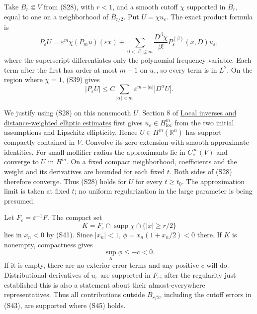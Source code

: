\documentclass[
  11pt,
]{article}
\begin{document}
Take \(B_r\Subset V\) from (S28), with \(r<1\), and a smooth cutoff
\(\chi\) supported in \(B_r\), equal to one on a neighborhood of
\(\overline B_{r/2}\). Put \(U=\chi u_\varepsilon\). The exact product
formula is \[
 P_\varepsilon U
 =\varepsilon^m\chi(P_mu)(\varepsilon x)
   +\sum_{0<|\beta|\leq m}\frac{D^\beta\chi}{\beta!}
                    P_\varepsilon^{(\beta)}(x,D)u_\varepsilon,
                                                                    \tag{S43}
\] where the superscript differentiates only the polynomial frequency
variable. Each term after the first has order at most \(m-1\) on
\(u_\varepsilon\), so every term is in \(L^2\). On the region where
\(\chi=1\), (S39) gives \[
 |P_\varepsilon U|
       \leq C\sum_{|\alpha|<m}
                       \varepsilon^{m-|\alpha|}|D^\alpha U|.    \tag{S44}
\]

We justify using (S28) on this nonsmooth \(U\). Section 8 of
\href{local-elliptic-coefficients.pdf}{Local inverses and
distance-weighted elliptic estimates} first gives
\(u_\varepsilon\in H^m_{\mathrm{loc}}\) from the two initial assumptions
and Lipschitz ellipticity. Hence \(U\in H^m(\mathbb R^n)\) has support
compactly contained in \(V\). Convolve its zero extension with smooth
approximate identities. For small mollifier radius the approximants lie
in \(C_c^\infty(V)\) and converge to \(U\) in \(H^m\). On a fixed
compact neighborhood, coefficients and the weight and its derivatives
are bounded for each fixed \(t\). Both sides of (S28) therefore
converge. Thus (S28) holds for \(U\) for every \(t\geq t_0\). The
approximation limit is taken at fixed \(t\); no uniform regularization
in the large parameter is being presumed.

Let \(F_\varepsilon=\varepsilon^{-1}F\). The compact set \[
 K=F_\varepsilon\cap\operatorname{supp}\chi
                         \cap\{|x|\geq r/2\}
\] lies in \(x_n<0\) by (S41). Since \(|x_n|<1\),
\(\phi=x_n(1+x_n/2)<0\) there. If \(K\) is nonempty, compactness gives
\[
                         \sup_K\phi\leq-c<0.                    \tag{S45}
\] If it is empty, there are no exterior error terms and any positive
\(c\) will do. Distributional derivatives of \(u_\varepsilon\) are
supported in \(F_\varepsilon\); after the regularity just established
this is also a statement about their almost-everywhere representatives.
Thus all contributions outside \(B_{r/2}\), including the cutoff errors
in (S43), are supported where (S45) holds.
\end{document}
